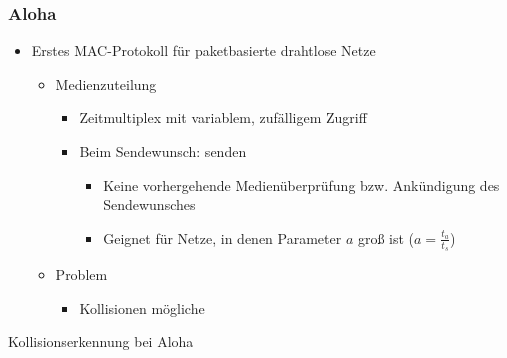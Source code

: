     \subsubsection{Aloha}
      \begin{itemize}
        \item Erstes MAC-Protokoll für paketbasierte drahtlose Netze
          \begin{itemize}
            \item Medienzuteilung
              \begin{itemize}
                \item Zeitmultiplex mit variablem, zufälligem Zugriff
                \item Beim Sendewunsch: senden
                  \begin{itemize}
                    \item Keine vorhergehende Medienüberprüfung bzw. Ankündigung des Sendewunsches
                    \item Geignet für Netze, in denen Parameter $a$ groß ist ($a=\frac{t_a}{t_s}$)
                  \end{itemize}
              \end{itemize}
            \item Problem
              \begin{itemize}
                \item Kollisionen mögliche
              \end{itemize}
          \end{itemize}
      \end{itemize}
      Kollisionserkennung bei Aloha
